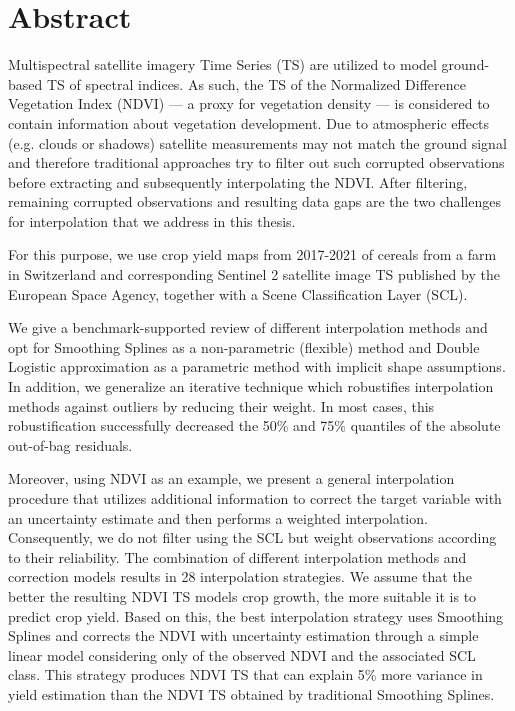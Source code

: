 \chapter*{Abstract}

Multispectral satellite imagery Time Series (TS) are utilized to model ground-based TS of spectral indices. As such, the TS of the Normalized Difference Vegetation Index (NDVI) --- a proxy for vegetation density --- is considered to contain information about vegetation development. 
Due to atmospheric effects (e.g. clouds or shadows) satellite measurements may not match the ground signal and therefore traditional approaches try to filter out such corrupted observations before extracting and subsequently interpolating the NDVI. After filtering, remaining corrupted observations and resulting data gaps are the two challenges for interpolation that we address in this thesis.

For this purpose, we use crop yield maps from 2017-2021 of cereals from a farm in Switzerland and corresponding Sentinel 2 satellite image TS published by the European Space Agency, together with a Scene Classification Layer (SCL). 

We give a benchmark-supported review of different interpolation methods and opt for Smoothing Splines as a non-parametric (flexible) method and Double Logistic approximation as a parametric method with implicit shape assumptions. In addition, we generalize an iterative technique which robustifies interpolation methods against outliers by reducing their weight. In most cases, this robustification successfully decreased the 50\% and 75\% quantiles of the absolute out-of-bag residuals. 

Moreover, using NDVI as an example, we present a general interpolation procedure that utilizes additional information to correct the target variable with an uncertainty estimate and then performs a weighted interpolation. Consequently, we do not filter using the SCL but weight observations according to their reliability. The combination of different interpolation methods and correction models results in 28 interpolation strategies. We assume that the better the resulting NDVI TS models crop growth, the more suitable it is to predict crop yield. Based on this, the best interpolation strategy uses Smoothing Splines and corrects the NDVI with uncertainty estimation through a simple linear model considering only of the observed NDVI and the associated SCL class. This strategy produces NDVI TS that can explain 5\% more variance in yield estimation than the NDVI TS obtained by traditional Smoothing Splines.

